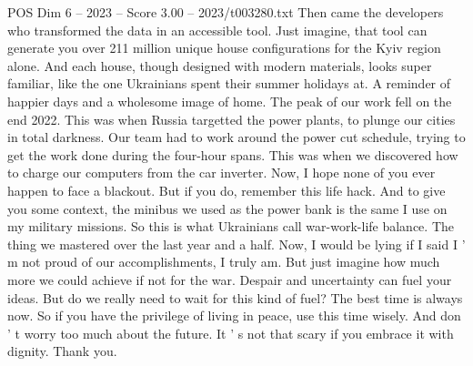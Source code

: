 \begin{textsample}{POS Dim 6 – 2023 – Score 3.00 – 2023/t003280.txt}
Then came the developers who transformed the data in an accessible tool.
Just imagine, that tool can generate you over 211 million unique house configurations for the Kyiv region alone.
And each house, though designed with modern materials, looks super familiar, like the one Ukrainians spent their summer holidays at.
A reminder of happier days and a wholesome image of home.
The peak of our work fell on the end 2022.
This was when Russia targetted the power plants, to plunge our cities in total darkness.
Our team had to work around the power cut schedule, trying to get the work done during the four-hour spans.
This was when we discovered how to charge our computers from the car inverter.
Now, I hope none of you ever happen to face a blackout.
But if you do, remember this life hack.
And to give you some context, the minibus we used as the power bank is the same I use on my military missions.
So this is what Ukrainians call war-work-life balance.
The thing we mastered over the last year and a half.
Now, I would be lying if I said I ' m not proud of our accomplishments, I truly am.
But just imagine how much more we could achieve if not for the war.
Despair and uncertainty can fuel your ideas.
But do we really need to wait for this kind of fuel?
The best time is always now.
So if you have the privilege of living in peace, use this time wisely.
And don ' t worry too much about the future.
It ' s not that scary if you embrace it with dignity.
Thank you.

\end{textsample}
